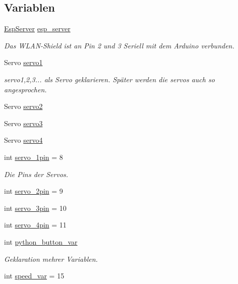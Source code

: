 \subsection*{Variablen}
\begin{DoxyCompactItemize}
\item 
\hyperlink{class_esp_server}{Esp\+Server} \hyperlink{_arduino__kommentiert_8ino_a92309e3a6d185d9188757bac49168fe5}{esp\+\_\+server}
\begin{DoxyCompactList}\small\item\em Das W\+L\+A\+N-\/\+Shield ist an Pin 2 und 3 Seriell mit dem Arduino verbunden. \end{DoxyCompactList}\item 
Servo \hyperlink{_arduino__kommentiert_8ino_ac5d2bea44c6318454db0e2639a4efe95}{servo1}
\begin{DoxyCompactList}\small\item\em servo1,2,3... als Servo geklarieren. Später werden die servos auch so angesprochen. \end{DoxyCompactList}\item 
Servo \hyperlink{_arduino__kommentiert_8ino_a6458146b8e54c3729bbee8c037921c72}{servo2}
\item 
Servo \hyperlink{_arduino__kommentiert_8ino_a7c0244e667b5f7c873df01946f0767bd}{servo3}
\item 
Servo \hyperlink{_arduino__kommentiert_8ino_a207f149c99b91a8bacd26b8b70dfc71c}{servo4}
\item 
int \hyperlink{_arduino__kommentiert_8ino_ac5b3a3df1bbdb6b2c8e8988c7373ad97}{servo\+\_\+1pin} = 8
\begin{DoxyCompactList}\small\item\em Die Pins der Servos. \end{DoxyCompactList}\item 
int \hyperlink{_arduino__kommentiert_8ino_a0fcb42829030c7eab1ede7429256f14d}{servo\+\_\+2pin} = 9
\item 
int \hyperlink{_arduino__kommentiert_8ino_a006b96047ca9585e312d88690d5a95a3}{servo\+\_\+3pin} = 10
\item 
int \hyperlink{_arduino__kommentiert_8ino_a5c0d394c06f48072ed4a5cf3f5f3b81b}{servo\+\_\+4pin} = 11
\item 
int \hyperlink{_arduino__kommentiert_8ino_a409d566aad8f36a68f5c2ec46ce59393}{python\+\_\+button\+\_\+var}
\begin{DoxyCompactList}\small\item\em Geklaration mehrer Variablen. \end{DoxyCompactList}\item 
int \hyperlink{_arduino__kommentiert_8ino_a8b03f5396d8e845086daab48dcaca5cb}{speed\+\_\+var} = 15
\end{DoxyCompactItemize}



